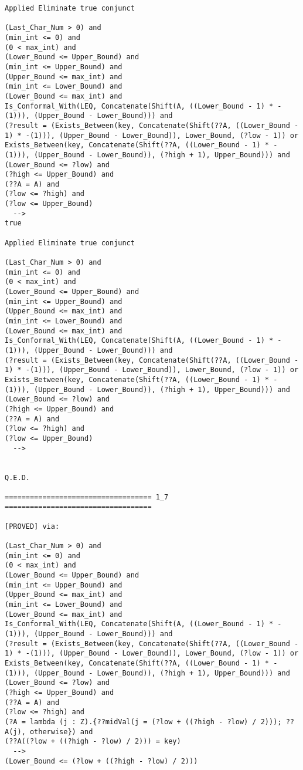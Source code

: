 \begin{lstlisting}[language=resolve]
Applied Eliminate true conjunct

(Last_Char_Num > 0) and
(min_int <= 0) and
(0 < max_int) and
(Lower_Bound <= Upper_Bound) and
(min_int <= Upper_Bound) and
(Upper_Bound <= max_int) and
(min_int <= Lower_Bound) and
(Lower_Bound <= max_int) and
Is_Conformal_With(LEQ, Concatenate(Shift(A, ((Lower_Bound - 1) * -(1))), (Upper_Bound - Lower_Bound))) and
(?result = (Exists_Between(key, Concatenate(Shift(??A, ((Lower_Bound - 1) * -(1))), (Upper_Bound - Lower_Bound)), Lower_Bound, (?low - 1)) or Exists_Between(key, Concatenate(Shift(??A, ((Lower_Bound - 1) * -(1))), (Upper_Bound - Lower_Bound)), (?high + 1), Upper_Bound))) and
(Lower_Bound <= ?low) and
(?high <= Upper_Bound) and
(??A = A) and
(?low <= ?high) and
(?low <= Upper_Bound)
  -->
true

Applied Eliminate true conjunct

(Last_Char_Num > 0) and
(min_int <= 0) and
(0 < max_int) and
(Lower_Bound <= Upper_Bound) and
(min_int <= Upper_Bound) and
(Upper_Bound <= max_int) and
(min_int <= Lower_Bound) and
(Lower_Bound <= max_int) and
Is_Conformal_With(LEQ, Concatenate(Shift(A, ((Lower_Bound - 1) * -(1))), (Upper_Bound - Lower_Bound))) and
(?result = (Exists_Between(key, Concatenate(Shift(??A, ((Lower_Bound - 1) * -(1))), (Upper_Bound - Lower_Bound)), Lower_Bound, (?low - 1)) or Exists_Between(key, Concatenate(Shift(??A, ((Lower_Bound - 1) * -(1))), (Upper_Bound - Lower_Bound)), (?high + 1), Upper_Bound))) and
(Lower_Bound <= ?low) and
(?high <= Upper_Bound) and
(??A = A) and
(?low <= ?high) and
(?low <= Upper_Bound)
  -->


Q.E.D.

=================================== 1_7 ===================================

[PROVED] via:

(Last_Char_Num > 0) and
(min_int <= 0) and
(0 < max_int) and
(Lower_Bound <= Upper_Bound) and
(min_int <= Upper_Bound) and
(Upper_Bound <= max_int) and
(min_int <= Lower_Bound) and
(Lower_Bound <= max_int) and
Is_Conformal_With(LEQ, Concatenate(Shift(A, ((Lower_Bound - 1) * -(1))), (Upper_Bound - Lower_Bound))) and
(?result = (Exists_Between(key, Concatenate(Shift(??A, ((Lower_Bound - 1) * -(1))), (Upper_Bound - Lower_Bound)), Lower_Bound, (?low - 1)) or Exists_Between(key, Concatenate(Shift(??A, ((Lower_Bound - 1) * -(1))), (Upper_Bound - Lower_Bound)), (?high + 1), Upper_Bound))) and
(Lower_Bound <= ?low) and
(?high <= Upper_Bound) and
(??A = A) and
(?low <= ?high) and
(?A = lambda (j : Z).{??midVal(j = (?low + ((?high - ?low) / 2))); ??A(j), otherwise}) and
(??A((?low + ((?high - ?low) / 2))) = key)
  -->
(Lower_Bound <= (?low + ((?high - ?low) / 2)))


\end{lstlisting}
